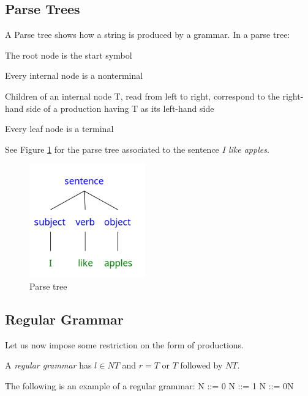 \documentclass{article}
\begin{document}
\subsection{Parse Trees}
A {\color{red} Parse tree} shows how a string is produced by a grammar.
In a parse tree:
\begin{tightlist}
\item
The root node is the start symbol
\item
Every internal node is a nonterminal
\item
Children of an internal node  T, read from left to right, correspond to the right-hand side
of a production having T as its left-hand side 
\item
Every leaf node is a terminal
\end{tightlist}

\begin{example}
See Figure \ref{parsetree} for the parse tree associated to the sentence
 \emph{I like apples}.
 
\begin{figure}
 \centering
\includegraphics[width=5cm]{apple_tree.png}
 \caption{Parse tree}
  \label{parsetree}
\end{figure}
\end{example}


\subsection{Regular Grammar}
Let us now impose some restriction on the form of productions.

\begin{definition} 
A {\emph{regular grammar}} has $l \in NT $ and $ r = T$ or $T$ followed by $NT$.
\end{definition}

\begin{example}
The following is an example of a regular grammar:
\newline
N ::= 0 \newline
N ::= 1 \newline
N ::= 0N \newline
\end{example}
\end{document}
